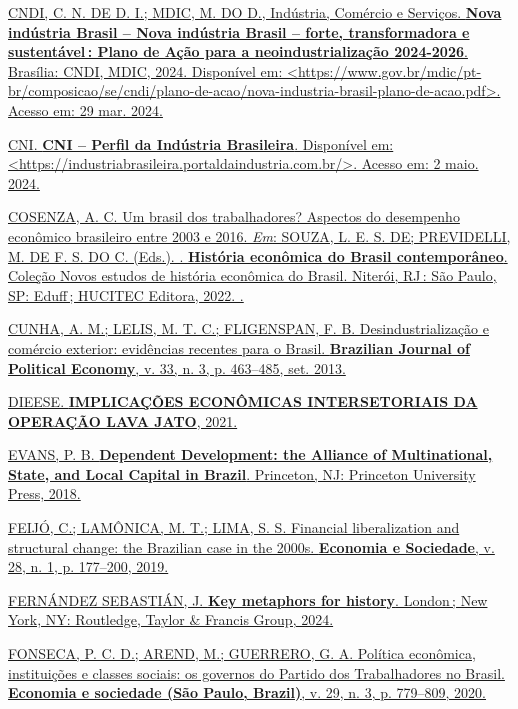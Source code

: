 \href{https://www.zotero.org/google-docs/?p3HTgZ}{CNDI, C. N. DE D. I.;
MDIC, M. DO D., Indústria, Comércio e Serviços. \textbf{Nova indústria
Brasil -- Nova indústria Brasil -- forte, transformadora e
sustentável\,: Plano de Ação para a neoindustrialização 2024-2026}.
Brasília: CNDI, MDIC, 2024. Disponível em:
\textless https://www.gov.br/mdic/pt-br/composicao/se/cndi/plano-de-acao/nova-industria-brasil-plano-de-acao.pdf\textgreater.
Acesso em: 29 mar. 2024.}

\href{https://www.zotero.org/google-docs/?p3HTgZ}{CNI. \textbf{CNI --
Perfil da Indústria Brasileira}. Disponível em:
\textless https://industriabrasileira.portaldaindustria.com.br/\textgreater.
Acesso em: 2 maio. 2024.}

\href{https://www.zotero.org/google-docs/?p3HTgZ}{COSENZA, A. C. Um
brasil dos trabalhadores? Aspectos do desempenho econômico brasileiro
entre 2003 e 2016. \emph{Em}: SOUZA, L. E. S. DE; PREVIDELLI, M. DE F.
S. DO C. (Eds.). . \textbf{História econômica do Brasil contemporâneo}.
Coleção Novos estudos de história econômica do Brasil. Niterói, RJ\,:
São Paulo, SP: Eduff\,; HUCITEC Editora, 2022. .}

\href{https://www.zotero.org/google-docs/?p3HTgZ}{CUNHA, A. M.; LELIS,
M. T. C.; FLIGENSPAN, F. B. Desindustrialização e comércio exterior:
evidências recentes para o Brasil. \textbf{Brazilian Journal of
Political Economy}, v. 33, n. 3, p. 463--485, set. 2013.}

\href{https://www.zotero.org/google-docs/?p3HTgZ}{DIEESE.
\textbf{IMPLICAÇÕES ECONÔMICAS INTERSETORIAIS DA OPERAÇÃO LAVA JATO},
2021.}

\href{https://www.zotero.org/google-docs/?p3HTgZ}{EVANS, P. B.
\textbf{Dependent Development: the Alliance of Multinational, State, and
Local Capital in Brazil}. Princeton, NJ: Princeton University Press,
2018.}

\href{https://www.zotero.org/google-docs/?p3HTgZ}{FEIJÓ, C.; LAMÔNICA,
M. T.; LIMA, S. S. Financial liberalization and structural change: the
Brazilian case in the 2000s. \textbf{Economia e Sociedade}, v. 28, n. 1,
p. 177--200, 2019.}

\href{https://www.zotero.org/google-docs/?p3HTgZ}{FERNÁNDEZ SEBASTIÁN,
J. \textbf{Key metaphors for history}. London\,; New York, NY:
Routledge, Taylor \& Francis Group, 2024.}

\href{https://www.zotero.org/google-docs/?p3HTgZ}{FONSECA, P. C. D.;
AREND, M.; GUERRERO, G. A. Política econômica, instituições e classes
sociais: os governos do Partido dos Trabalhadores no Brasil.
\textbf{Economia e sociedade (São Paulo, Brazil)}, v. 29, n. 3, p.
779--809, 2020.}

